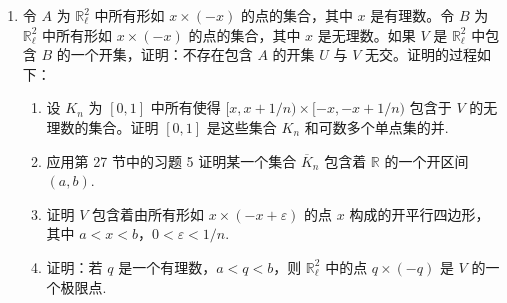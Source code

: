 \begin{enumerate}
\textbf{定理}\quad 设 $G$ 是一个紧致拓扑群，$X$ 是一个拓扑空间。$\alpha$ 是 $G$ 在 $X$ 上的一个作用。若对于 Hausdorff 条件、正则性、正规性、局部紧致性，以及第二可数性公理这些性质，$X$ 满足其中的一个性质，则 $X/G$ 也满足同样的性质。[提示：见第 26 节的习题 13。]
\item 令 $A$ 为 $\mathbb{R}_{\ell}^{2}$ 中所有形如 $x\times(-x)$ 的点的集合，其中 $x$ 是有理数。令 $B$ 为 $\mathbb{R}_{\ell}^{2}$ 中所有形如 $x\times(-x)$ 的点的集合，其中 $x$ 是无理数。如果 $V$ 是 $\mathbb{R}_{\ell}^{2}$ 中包含 $B$ 的一个开集，证明：不存在包含 $A$ 的开集 $U$ 与 $V$ 无交。证明的过程如下：
\begin{enumerate}
\item 设 $K_{n}$ 为 $[0,1]$ 中所有使得 $[x,x+1/n)\times[-x,-x+1/n)$ 包含于 $V$ 的无理数的集合。证明 $[0,1]$ 是这些集合 $K_{n}$ 和可数多个单点集的并.
\item 应用第 27 节中的习题 5 证明某一个集合 $\overline{K}_{n}$ 包含着 $\mathbb{R}$ 的一个开区间 $(a,b)$.
\item 证明 $V$ 包含着由所有形如 $x\times(-x+\varepsilon)$ 的点 $x$ 构成的开平行四边形，其中 $a<x<b$，$0<\varepsilon<1/n$.
\item 证明：若 $q$ 是一个有理数，$a<q<b$，则 $\mathbb{R}_{\ell}^{2}$ 中的点 $q\times(-q)$ 是 $V$ 的一个极限点.
\end{enumerate}
\end{enumerate}